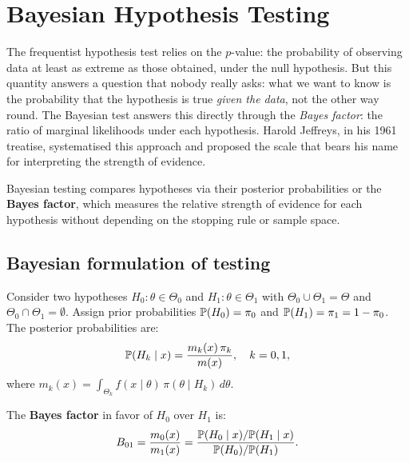 \chapter{Bayesian Hypothesis Testing}
\label{ch:testing}

The frequentist hypothesis test relies on the $p$-value: the probability of observing data at least as extreme as those obtained, under the null hypothesis. But this quantity answers a question that nobody really asks: what we want to know is the probability that the hypothesis is true \emph{given the data}, not the other way round. The Bayesian test answers this directly through the \emph{Bayes factor}: the ratio of marginal likelihoods under each hypothesis. Harold Jeffreys, in his 1961 treatise, systematised this approach and proposed the scale that bears his name for interpreting the strength of evidence.

\begin{intuition}[title=\textbf{Central idea}]
Bayesian testing compares hypotheses via their posterior probabilities or
the \textbf{Bayes factor}, which measures the relative strength of
evidence for each hypothesis without depending on the stopping rule or
sample space.
\end{intuition}

\section{Bayesian formulation of testing}

\begin{definition}
Consider two hypotheses $H_0 : \theta \in \Theta_0$ and
$H_1 : \theta \in \Theta_1$ with $\Theta_0 \cup \Theta_1 = \Theta$
and $\Theta_0 \cap \Theta_1 = \emptyset$. Assign prior probabilities
$\mathbb{P}(H_0) = \pi_0$ and $\mathbb{P}(H_1) = \pi_1 = 1 - \pi_0$. The posterior
probabilities are:
\[
  \mathbb{P}(H_k \mid x) = \frac{m_k(x)\,\pi_k}{m(x)},
  \quad k = 0, 1,
\]
where $m_k(x) = \int_{\Theta_k} f(x \mid \theta)\,\pi(\theta \mid H_k)\,d\theta$.
\end{definition}

\begin{definition}
The \textbf{Bayes factor} in favor of $H_0$ over $H_1$ is:
\[
  B_{01} = \frac{m_0(x)}{m_1(x)}
  = \frac{\mathbb{P}(H_0 \mid x) / \mathbb{P}(H_1 \mid x)}
         {\mathbb{P}(H_0) / \mathbb{P}(H_1)}.
\]
\end{definition}

